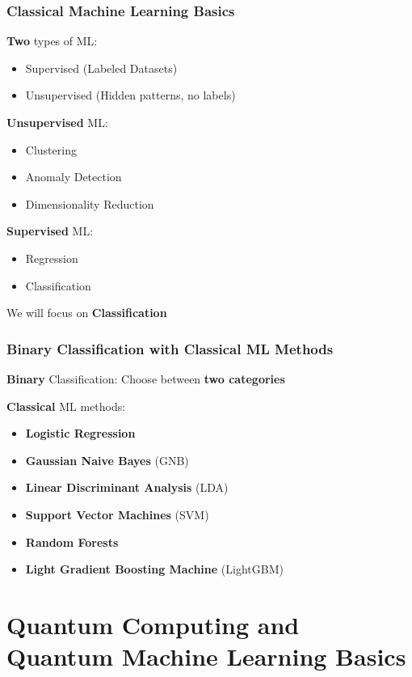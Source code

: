 \documentclass{beamer}
\begin{document}
\begin{frame}
	\frametitle{Classical Machine Learning Basics}
	\textbf{Two} types of ML:
	\begin{itemize}
		\item Supervised (Labeled Datasets)
		\item Unsupervised (Hidden patterns, no labels)
	\end{itemize}	
	
\textbf{Unsupervised} ML:
	\begin{itemize}
		\item Clustering
		\item Anomaly Detection
		\item Dimensionality Reduction
	\end{itemize}
	
	\textbf{Supervised} ML:
	\begin{itemize}
		\item Regression
		\item Classification
	\end{itemize}	
	
	We will focus on \textbf{Classification}
	
\end{frame}

\begin{frame}
	\frametitle{Binary Classification with Classical ML Methods}
	\textbf{Binary} Classification: Choose between \textbf{two categories}
	
	\textbf{Classical} ML methods:
	\begin{itemize}
		\item \textbf{Logistic Regression}
		\item \textbf{Gaussian Naive Bayes} (GNB)
		\item \textbf{Linear Discriminant Analysis} (LDA)
		\item \textbf{Support Vector Machines} (SVM)
		\item \textbf{Random Forests}
		\item \textbf{Light Gradient Boosting Machine} (LightGBM)
	\end{itemize}
\end{frame}

\section{Quantum Computing and Quantum Machine Learning Basics}

\end{document}
